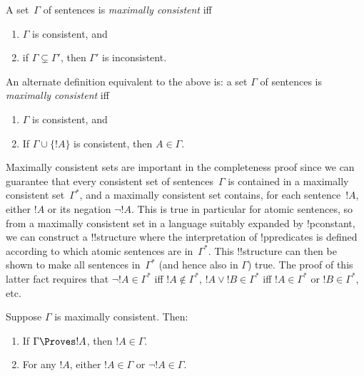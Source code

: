 \documentclass[../../include/open-logic-section]{subfiles}
\begin{document}

\begin{defn}
A set~$\Gamma$ of sentences is \emph{maximally consistent} iff
\begin{enumerate}
\item $\Gamma$ is consistent, and
\item if $\Gamma \subsetneq \Gamma'$, then $\Gamma'$ is inconsistent.
\end{enumerate}
\end{defn}

\begin{digress}
An alternate definition equivalent to the above is: a set $\Gamma$ of
sentences is \emph{maximally consistent} iff
\begin{enumerate}
\item $\Gamma$ is consistent, and
\item If $\Gamma \cup \{ !A \}$ is consistent, then $A \in \Gamma$.
\end{enumerate}
\end{digress}

\begin{explain}
Maximally consistent sets are important in the completeness proof
since we can guarantee that every consistent set of sentences~$\Gamma$
is contained in a maximally consistent set~$\Gamma^*$, and a maximally
consistent set contains, for each sentence~$!A$, either $!A$ or its
negation $\lnot !A$.  This is true in particular for atomic sentences,
so from a maximally consistent set in a language suitably expanded by
!p{constant}, we can construct a !!{structure} where the
interpretation of !p{predicates} is defined according to which atomic
sentences are in~$\Gamma^*$. This !!{structure} can then be shown to
make all sentences in~$\Gamma^*$ (and hence also in $\Gamma$)
true. The proof of this latter fact requires that $\lnot !A \in
\Gamma^*$ iff $!A \notin \Gamma^*$, $!A \lor !B \in \Gamma^*$ iff $!A
\in \Gamma^*$ or $!B \in \Gamma^*$, etc.
\end{explain}

\begin{prop}
Suppose $\Gamma$ is maximally consistent. Then:
\begin{enumerate}
\item {} If $\Gamma \Proves !A$, then $!A \in
  \Gamma$.

\item {} For any $!A$, either $!A \in
  \Gamma$ or $\lnot !A \in \Gamma$.



\end{enumerate}
\end{prop}
\end{document}
